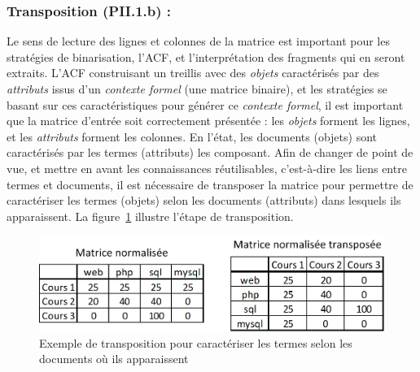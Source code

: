 %
%
%


\subsubsection{Transposition (PII.1.b) :}
\label{subsubsection:CREA:PII.1.b-transposition}

Le sens de lecture des lignes et colonnes de la matrice est important pour les stratégies de binarisation, l'ACF, et l'interprétation des fragments qui en seront extraits.
L'ACF construisant un treillis avec des \textit{objets} caractérisés par des \textit{attributs} issus d'un \textit{contexte formel} (une matrice binaire), et les stratégies se basant sur ces caractéristiques pour générer ce \textit{contexte formel}, il est important que la matrice d'entrée soit correctement présentée : les \textit{objets} forment les lignes, et les \textit{attributs} forment les colonnes.
En l'état, les documents (objets) sont caractérisés par les termes (attributs) les composant.
Afin de changer de point de vue, et mettre en avant les connaissances réutilisables, c'est-à-dire les liens entre termes et documents, il est nécessaire de transposer la matrice pour permettre de caractériser les termes (objets) selon les documents (attributs) dans lesquels ils apparaissent.
La figure~\ref{figure:3-II-1-b-Transposition} illustre l'étape de transposition.

\begin{figure}[ht]
\centering
\centerline{  %
\includegraphics[scale=1]{3-Methode-CREA/images/2-analyse-structurelle/exemple_transposition.png}
}
\caption{Exemple de transposition pour caractériser les termes selon les documents où ils apparaissent}
\label{figure:3-II-1-b-Transposition}
\end{figure}


